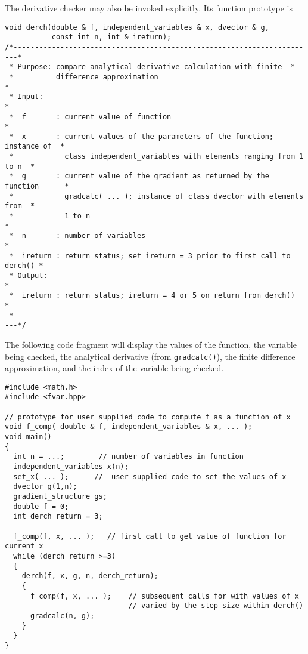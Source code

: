\documentclass{admbmanual}
\begin{document}
The derivative checker may also be invoked explicitly. Its function
prototype is
\begin{lstlisting}
void derch(double & f, independent_variables & x, dvector & g,
           const int n, int & ireturn);
/*-----------------------------------------------------------------------*
 * Purpose: compare analytical derivative calculation with finite  *
 *          difference approximation                                                    *
 * Input:                                                                    *
 *  f       : current value of function                                      *
 *  x       : current values of the parameters of the function; instance of  *
 *            class independent_variables with elements ranging from 1 to n  *
 *  g       : current value of the gradient as returned by the function      *
 *            gradcalc( ... ); instance of class dvector with elements from  *
 *            1 to n                                                         *
 *  n       : number of variables                                            *
 *  ireturn : return status; set ireturn = 3 prior to first call to derch() *
 * Output:                                                                   *
 *  ireturn : return status; ireturn = 4 or 5 on return from derch()         *
 *-----------------------------------------------------------------------*/           
\end{lstlisting}


The following code fragment will display 
the values of the function, the variable being checked,
the analytical derivative (from \texttt{gradcalc()}), the finite difference
approximation, and the index of the variable being checked.
\begin{lstlisting}
#include <math.h>
#include <fvar.hpp>

// prototype for user supplied code to compute f as a function of x
void f_comp( double & f, independent_variables & x, ... ); 
void main()
{
  int n = ...;        // number of variables in function    
  independent_variables x(n);
  set_x( ... );      //  user supplied code to set the values of x
  dvector g(1,n);
  gradient_structure gs;  
  double f = 0;
  int derch_return = 3; 

  f_comp(f, x, ... );   // first call to get value of function for current x
  while (derch_return >=3)
  { 
    derch(f, x, g, n, derch_return);
    {
      f_comp(f, x, ... );    // subsequent calls for with values of x
                             // varied by the step size within derch()
      gradcalc(n, g);
    }
  }
}
\end{lstlisting}
\end{document}
